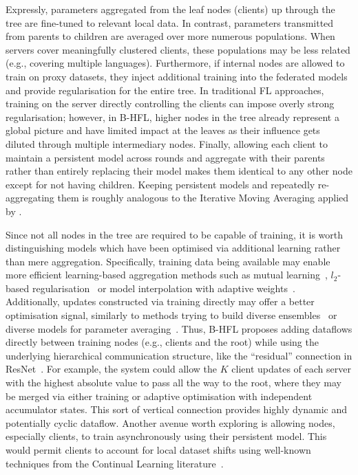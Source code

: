 Expressly, parameters aggregated from the leaf nodes (clients) up through the tree are fine-tuned to relevant local data. In contrast, parameters transmitted from parents to children are averaged over more numerous populations. When servers cover meaningfully clustered clients, these populations may be less related (e.g., covering multiple languages). Furthermore, if internal nodes are allowed to train on proxy datasets, they inject additional training into the federated models and provide regularisation for the entire tree. In traditional FL approaches, training on the server directly controlling the clients can impose overly strong regularisation; however, in B-HFL, higher nodes in the tree already represent a global picture and have limited impact at the leaves as their influence gets diluted through multiple intermediary nodes. Finally, allowing each client to maintain a persistent model across rounds and aggregate with their parents rather than entirely replacing their model makes them identical to any other node except for not having children. Keeping persistent models and repeatedly re-aggregating them is roughly analogous to the Iterative Moving Averaging applied by \citet{UnderstandingModelAveragingInFL}.

Since not all nodes in the tree are required to be capable of training, it is worth distinguishing models which have been optimised via additional learning rather than mere aggregation. Specifically, training data being available may enable more efficient learning-based aggregation methods such as mutual learning~\citep{DeepMutualLearning}, $l_2$-based regularisation~\citep{Ditto} or model interpolation with adaptive weights~\citep{AdaptivePersonalisedFederatedLearning,ThreeApproachesMansour}. Additionally, updates constructed via training directly may offer a better optimisation signal, similarly to methods trying to build diverse ensembles~\citep{StochasticMultipleChoiceLearningDiverseEnsembles} or diverse models for parameter averaging~\citep{DiverseWeightAveraging}. Thus, B-HFL proposes adding dataflows directly between training nodes (e.g., clients and the root) while using the underlying hierarchical communication structure, like the ``residual'' connection in ResNet~\citep{ResNet}. For example, the system could allow the $K$ client updates of each server with the highest absolute value to pass all the way to the root, where they may be merged via either training or adaptive optimisation with independent accumulator states. This sort of vertical connection provides highly dynamic and potentially cyclic dataflow. Another avenue worth exploring is allowing nodes, especially clients, to train asynchronously using their persistent model. This would permit clients to account for local dataset shifts using well-known techniques from the Continual Learning literature~\citep{ContinualLearningSurvey,LearningWithoutForgetting,EWC}.


